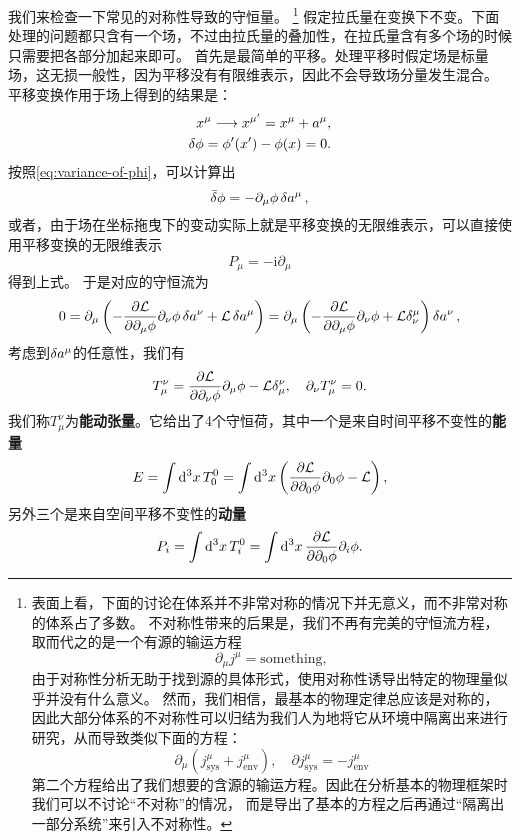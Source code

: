 \documentclass[UTF8, a4paper]{ctexart}
\newcommand*{\ii}{\mathrm{i}}
\begin{document}
我们来检查一下常见的对称性导致的守恒量。%
\footnote{表面上看，下面的讨论在体系并不非常对称的情况下并无意义，而不非常对称的体系占了多数。
不对称性带来的后果是，我们不再有完美的守恒流方程，取而代之的是一个有源的输运方程
\[
    \partial_\mu j^\mu = \text{something},
\]
由于对称性分析无助于找到源的具体形式，使用对称性诱导出特定的物理量似乎并没有什么意义。
然而，我们相信，最基本的物理定律总应该是对称的，因此大部分体系的不对称性可以归结为我们人为地将它从环境中隔离出来进行研究，从而导致类似下面的方程：
\[
    \partial_\mu (j^\mu_\text{sys} + j^\mu_\text{env}), \quad \partial j^\mu_\text{sys} = - j^\mu_\text{env}
\]
第二个方程给出了我们想要的含源的输运方程。因此在分析基本的物理框架时我们可以不讨论“不对称”的情况，
而是导出了基本的方程之后再通过“隔离出一部分系统”来引入不对称性。
}%
假定拉氏量在变换下不变。下面处理的问题都只含有一个场，不过由拉氏量的叠加性，在拉氏量含有多个场的时候只需要把各部分加起来即可。
首先是最简单的平移。处理平移时假定场是标量场，这无损一般性，因为平移没有有限维表示，因此不会导致场分量发生混合。
平移变换作用于场上得到的结果是：
\[
    \begin{split}
        x^\mu \longrightarrow x^{\mu'} = x^\mu + a^\mu, \\
        \var{\phi} = \phi'(x') - \phi(x) = 0.
    \end{split}
\]
按照\eqref{eq:variance-of-phi}，可以计算出
\[
    \bar{\var}{\phi} = - \partial_\mu \phi \var{a^\mu},
\]
或者，由于场在坐标拖曳下的变动实际上就是平移变换的无限维表示，可以直接使用平移变换的无限维表示
\[
    P_\mu = - \ii \partial_\mu
\]
得到上式。
于是对应的守恒流为
\[
    0 = \partial_\mu \left( - \pdv{\mathcal{L}}{\partial_\mu \phi} \partial_\nu \phi \var{a^\nu} + \mathcal{L} \var{a^\mu} \right) 
    = \partial_\mu \left( - \pdv{\mathcal{L}}{\partial_\mu \phi} \partial_\nu \phi + \mathcal{L} \delta^\mu_\nu \right) \var{a^\nu},
\]
考虑到$\var{a^\mu}$的任意性，我们有
\begin{equation}
    T_\mu^\nu = \pdv{\mathcal{L}}{\partial_\nu \phi} \partial_\mu \phi - \mathcal{L} \delta^\nu_\mu, \quad \partial_\nu T_\mu^\nu = 0.
\end{equation}
我们称$T^\nu_\mu$为\textbf{能动张量}。它给出了4个守恒荷，其中一个是来自时间平移不变性的\textbf{能量}
\begin{equation}
    E = \int \dd[3]{x} T^0_0 = \int \dd[3]{x} \left( \pdv{\mathcal{L}}{\partial_0 \phi} \partial_0 \phi - \mathcal{L} \right) ,
    \label{eq:field-energy}
\end{equation}
另外三个是来自空间平移不变性的\textbf{动量}
\begin{equation}
    P_i = \int \dd[3]{x} T^0_i = \int \dd[3]{x} \pdv{\mathcal{L}}{\partial_0 \phi} \partial_i \phi .
    \label{eq:field-momentum}
\end{equation}
\end{document}
